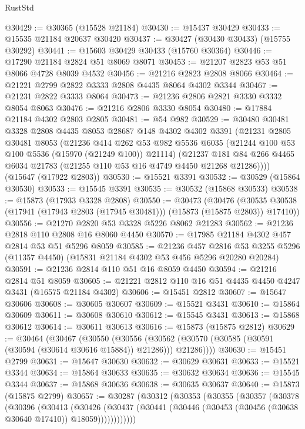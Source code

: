 \begin{lexlean}{RustStd}
\begin{coremodule}
@30429 := @30365 (@15528 @21184)
@30430 := @15437 @30429
@30433 := @15535 @21184 @20637 @30420
@30437 := @30427 (@30430 @30433) (@15755 @30292)
@30441 := @15603 @30429 @30433 (@15760 @30364)
@30446 := @17290 @21184 @2824 @51 @8069 @8071
@30453 := @21207 @2823 @53 @51 @8066 @4728 @8039 @4532
@30456 := @21216 @2823 @2808 @8066
@30464 := @21221 @2799 @2822 @3333 @2808 @4435 @8064 @4302 @3344
@30467 := @21231 @2822 @3333 @8064
@30473 := @21236 @2806 @2821 @3330 @3332 @8054 @8063
@30476 := @21216 @2806 @3330 @8054
@30480 := @17884 @21184 @4302 @2803 @2805
@30481 := @54 @982
@30529 := @30480
    @30481
    @3328
    @2808
    @4435
    @8053
    @28687
    @148
    @4302
    @4302
    @3391
    (@21231
      @2805
      @30481
      @8053
      (@21236
        @414
        @262
        @53
        @982
        @5536
        @6035
        (@21244 @100 @53 @100 @5536 (@15970 (@21249 @100)) @21114)
        (@21237 @181 @84 @266 @4465 @6034 @21783 (@21255 @110 @53 @16 @4749 @4450 @21268 @21286))))
    (@15647 (@17922 @2803))
@30530 := @15521 @3391
@30532 := @30529 (@15864 @30530)
@30533 := @15545 @3391
@30535 := @30532 (@15868 @30533)
@30538 := @15873 (@17933 @3328 @2808)
@30550 := @30473
    (@30476 (@30535 @30538 (@17941 (@17943 @2803 (@17945 @30481))) (@15873 (@15875 @2803)) @17410))
@30556 := @21270 @2820 @53 @3328 @5226 @8062 @21283
@30562 := @21236 @2818 @110 @2808 @16 @8060 @4450
@30570 := @17985 @21184 @4302 @457 @2814 @53 @51 @5296 @8059
@30585 := @21236
    @457
    @2816
    @53
    @3255
    @5296
    (@11357 @4450)
    (@15831 @21184 @4302 @53 @456 @5296 @20280 @20284)
@30591 := @21236 @2814 @110 @51 @16 @8059 @4450
@30594 := @21216 @2814 @51 @8059
@30605 := @21221 @2812 @110 @16 @51 @4435 @4450 @4247 @3431 (@16575 @21184 @4302)
@30606 := @15451 @2812
@30607 := @15647 @30606
@30608 := @30605 @30607
@30609 := @15521 @3431
@30610 := @15864 @30609
@30611 := @30608 @30610
@30612 := @15545 @3431
@30613 := @15868 @30612
@30614 := @30611 @30613
@30616 := @15873 (@15875 @2812)
@30629 := @30464
    (@30467
      (@30550
        (@30556 (@30562 (@30570 (@30585 (@30591 (@30594 (@30614 @30616 @15884)) @21286))) @21286))))
@30630 := @15451 @2799
@30631 := @15647 @30630
@30632 := @30629 @30631
@30633 := @15521 @3344
@30634 := @15864 @30633
@30635 := @30632 @30634
@30636 := @15545 @3344
@30637 := @15868 @30636
@30638 := @30635 @30637
@30640 := @15873 (@15875 @2799)
@30657 := @30287
    (@30312
      (@30353
        (@30355
          (@30357
            (@30378
              (@30396
                (@30413
                  (@30426
                    (@30437
                      (@30441 (@30446 (@30453 (@30456 (@30638 @30640 @17410)) @18059))))))))))))

\end{coremodule}
\end{lexlean}
